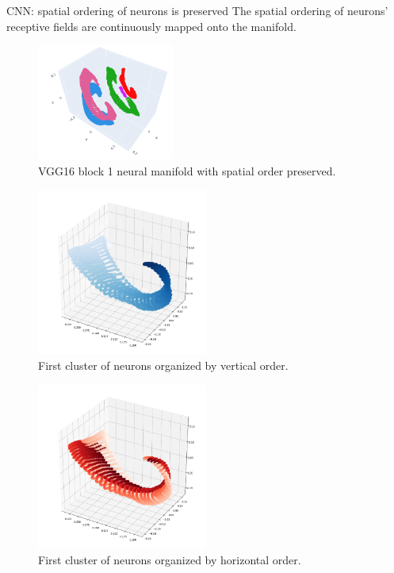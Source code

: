 \documentclass[xcolor={dvipsnames,svgnames}]{beamer}
\begin{document}
\begin{frame}{CNN: spatial ordering of neurons is preserved}
The spatial ordering of neurons' receptive fields are continuously mapped onto the manifold. 
\begin{figure}
            \includegraphics[width=0.4\textwidth]{figures/embeddings/VGG16-3D-block1.png}
            \caption{VGG16 block 1 neural manifold with spatial order preserved.}
        \end{figure} 
    \begin{minipage}[t]{.45\linewidth}  
    \begin{figure}
            \includegraphics[width=0.5\textwidth]{figures/embeddings/vgg16-spatial1.png}
            \caption{First cluster of neurons organized by vertical order.}
        \end{figure} 
    \end{minipage}
      \begin{minipage}[t]{.45\linewidth}   
      \begin{figure}         \includegraphics[width=0.5\textwidth]{figures/embeddings/vgg16-spatial2.png}
      \caption{First cluster of neurons organized by horizontal order.}
            \end{figure} 
    \end{minipage}
\end{frame}
\end{document}
